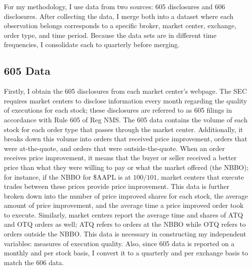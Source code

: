 \documentclass[12pt,a4paper]{article}
\begin{document}
	For my methodology, I use data from two sources: 605 disclosures and 606 disclosures. After collecting the data, I merge both into a dataset where each observation belongs corresponds to a specific broker, market center, exchange, order type, and time period. Because the data sets are in different time frequencies, I consolidate each to quarterly before merging. 
	
	\subsection{605 Data}
	
		Firstly, I obtain the 605 disclosures from each market center's webpage. The SEC requires market centers to disclose information every month regarding the quality of executions for each stock; these disclosures are referred to as 605 filings in accordance with Rule 605 of Reg NMS. The 605 data contains the volume of each stock for each order type that passes through the market center. Additionally, it breaks down this volume into orders that received price improvement, orders that were at-the-quote, and orders that were outside-the-quote. When an order receives price improvement, it means that the buyer or seller received a better price than what they were willing to pay or what the market offered (the NBBO); for instance, if the NBBO for \$AAPL is at $100/101$, market centers that execute trades between these prices provide price improvement. This data is further broken down into the number of price improved shares for each stock, the average amount of price improvement, and the average time a price improved order took to execute. Similarly, market centers report the average time and shares of ATQ and OTQ orders as well; ATQ refers to orders at the NBBO while OTQ refers to orders outside the NBBO. This data is necessary in constructing my independent variables: measures of execution quality. Also, since 605 data is reported on a monthly and per stock basis, I convert it to a quarterly and per exchange basis to match the 606 data. 
			
%			
	
\end{document}
